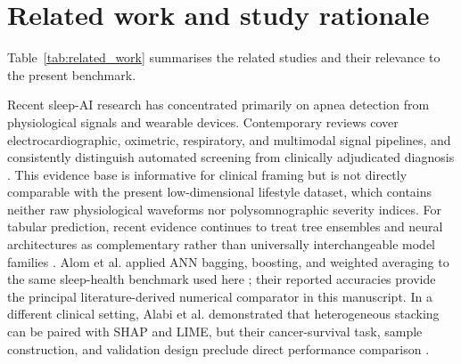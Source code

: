 \documentclass[a4paper,fleqn]{cas-dc}
\begin{document}
\section{Related work and study rationale}

Table~\ref{tab:related_work} summarises the related studies and their relevance to the present benchmark.

Recent sleep-AI research has concentrated primarily on apnea detection from physiological signals and wearable devices. Contemporary reviews cover electrocardiographic, oximetric, respiratory, and multimodal signal pipelines, and consistently distinguish automated screening from clinically adjudicated diagnosis \cite{bazoukis2023,tyagi2023,abdalrazaq2024,giorgi2025}. This evidence base is informative for clinical framing but is not directly comparable with the present low-dimensional lifestyle dataset, which contains neither raw physiological waveforms nor polysomnographic severity indices. For tabular prediction, recent evidence continues to treat tree ensembles and neural architectures as complementary rather than universally interchangeable model families \cite{borisov2024}. Alom et al. applied ANN bagging, boosting, and weighted averaging to the same sleep-health benchmark used here \cite{alom2024}; their reported accuracies provide the principal literature-derived numerical comparator in this manuscript. In a different clinical setting, Alabi et al. demonstrated that heterogeneous stacking can be paired with SHAP and LIME, but their cancer-survival task, sample construction, and validation design preclude direct performance comparison \cite{alabi2023}.
\end{document}
